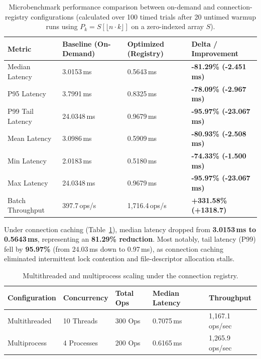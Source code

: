 \documentclass[sigconf,anonymous,review]{acmart}
\begin{document}
\begin{table}[t]
\centering
\caption{Microbenchmark performance comparison between on-demand and connection-registry configurations (calculated over 100 timed trials after 20 untimed warmup runs using $P_k = S[\lfloor n \cdot k \rfloor]$ on a zero-indexed array $S$).}
\label{tab:performance}
\small
\begin{tabular}{llll}
\toprule
\textbf{Metric} & \textbf{Baseline (On-Demand)} & \textbf{Optimized (Registry)} & \textbf{Delta / Improvement} \\
\midrule
Median Latency   & 3.0153\,ms  & 0.5643\,ms  & \textbf{-81.29\% (-2.451\,ms)} \\
P95 Latency      & 3.7991\,ms  & 0.8325\,ms  & \textbf{-78.09\% (-2.967\,ms)} \\
P99 Tail Latency & 24.0348\,ms & 0.9679\,ms  & \textbf{-95.97\% (-23.067\,ms)} \\
Mean Latency     & 3.0986\,ms  & 0.5909\,ms  & \textbf{-80.93\% (-2.508\,ms)} \\
Min Latency      & 2.0183\,ms  & 0.5180\,ms  & \textbf{-74.33\% (-1.500\,ms)} \\
Max Latency      & 24.0348\,ms & 0.9679\,ms  & \textbf{-95.97\% (-23.067\,ms)} \\
Batch Throughput & 397.7\,ops/s & 1,716.4\,ops/s & \textbf{+331.58\% (+1318.7)} \\
\bottomrule
\end{tabular}
\end{table}

Under connection caching (Table~\ref{tab:performance}), median latency dropped from \textbf{3.0153\,ms to 0.5643\,ms}, representing an \textbf{81.29\% reduction}. Most notably, tail latency (P99) fell by \textbf{95.97\%} (from 24.03\,ms down to 0.97\,ms), as connection caching eliminated intermittent lock contention and file-descriptor allocation stalls.

\begin{table}[t]
\centering
\caption{Multithreaded and multiprocess scaling under the connection registry.}
\label{tab:concurrency}
\small
\begin{tabular}{lllll}
\toprule
\textbf{Configuration} & \textbf{Concurrency} & \textbf{Total Ops} & \textbf{Median Latency} & \textbf{Throughput} \\
\midrule
Multithreaded & 10 Threads  & 300 Ops & 0.7075\,ms & 1,167.1\,ops/sec \\
Multiprocess  & 4 Processes & 200 Ops & 0.6165\,ms & 1,265.9\,ops/sec \\
\bottomrule
\end{tabular}
\end{table}
\end{document}
